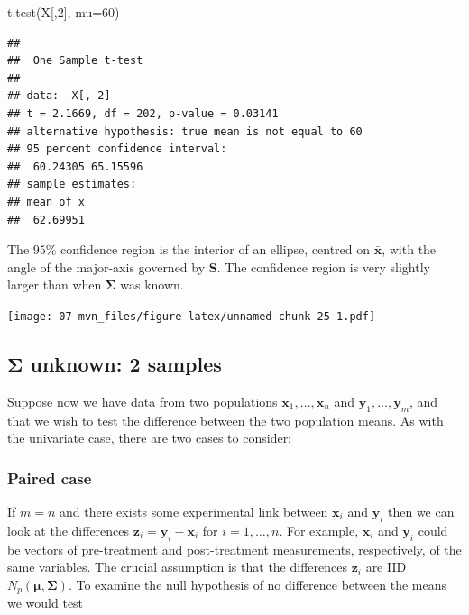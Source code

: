 \documentclass[
]{book}
\newenvironment{Shaded}{\begin{snugshade}}{\end{snugshade}}
\newcommand{\AttributeTok}[1]{\textcolor[rgb]{0.77,0.63,0.00}{#1}}
\newcommand{\DecValTok}[1]{\textcolor[rgb]{0.00,0.00,0.81}{#1}}
\newcommand{\FunctionTok}[1]{\textcolor[rgb]{0.00,0.00,0.00}{#1}}
\newcommand{\NormalTok}[1]{#1}
\theoremstyle{definition}
\theoremstyle{definition}
\theoremstyle{definition}
\theoremstyle{definition}
\theoremstyle{remark}
\begin{document}
\begin{Shaded}
\begin{Highlighting}[]
\FunctionTok{t.test}\NormalTok{(X[,}\DecValTok{2}\NormalTok{], }\AttributeTok{mu=}\DecValTok{60}\NormalTok{)}
\end{Highlighting}
\end{Shaded}

\begin{verbatim}
## 
##  One Sample t-test
## 
## data:  X[, 2]
## t = 2.1669, df = 202, p-value = 0.03141
## alternative hypothesis: true mean is not equal to 60
## 95 percent confidence interval:
##  60.24305 65.15596
## sample estimates:
## mean of x 
##  62.69951
\end{verbatim}

The \(95\)\% confidence region is the interior of an ellipse, centred on \(\bar{\mathbf x}\), with the angle of the major-axis governed by \(\mathbf S\). The confidence region is very slightly larger than when \(\boldsymbol{\Sigma}\) was known.

\texttt{[image: 07-mvn\_files/figure-latex/unnamed-chunk-25-1.pdf]}

\hypertarget{boldsymbolsigma-unknown-2-samples}{%
\subsection{\texorpdfstring{\(\boldsymbol{\Sigma}\) unknown: 2 samples}{\textbackslash boldsymbol\{\textbackslash Sigma\} unknown: 2 samples}}\label{boldsymbolsigma-unknown-2-samples}}

Suppose now we have data from two populations \(\mathbf x_1, \ldots, \mathbf x_n\) and \(\mathbf y_1,\ldots, \mathbf y_m\), and that we wish to test the difference between the two population means. As with the univariate case, there are two cases to consider:

\hypertarget{paired-case}{%
\subsubsection*{Paired case}\label{paired-case}}

If \(m=n\) and there exists some experimental link between \(\mathbf x_i\) and \(\mathbf y_i\) then we can look at the differences \(\mathbf z_i = \mathbf y_i - \mathbf x_i\) for \(i=1,\ldots,n\). For example, \(\mathbf x_i\) and \(\mathbf y_i\) could be vectors of pre-treatment and post-treatment measurements, respectively, of the same variables. The crucial assumption is that the differences \(\mathbf z_i\) are IID \(N_p({\boldsymbol{\mu}}, \boldsymbol{\Sigma})\). To examine the null hypothesis of no difference between the means we would test
\end{document}
